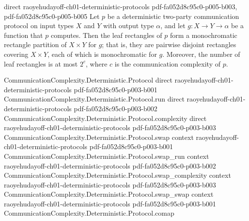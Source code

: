 \begin{theorem}
  {direct}
  {raoyehudayoff-ch01-deterministic-protocols}
  {pdf-fa052d8c95c0-p005-b003,
    pdf-fa052d8c95c0-p005-b005}
Let $p$ be a deterministic two-party communication protocol on input types $X$ and $Y$
with output type $\alpha$, and let $g : X \to Y \to \alpha$ be a function that $p$
computes. Then the leaf rectangles of $p$ form a monochromatic rectangle partition of $X
\times Y$ for $g$; that is, they are pairwise disjoint rectangles covering $X \times Y$,
each of which is monochromatic for $g$. Moreover, the number of leaf rectangles is at
most $2^{c}$, where $c$ is the communication complexity of $p$.
\end{theorem}

\begin{theorem}
\label{CommunicationComplexity.Deterministic.Protocol.reachesPath_isRectangle}
\leanok
{}
\proofstep
  {CommunicationComplexity.Deterministic.Protocol}
  {direct}
  {raoyehudayoff-ch01-deterministic-protocols}
  {pdf-fa052d8c95c0-p003-b001}
\proofstep
  {CommunicationComplexity.Deterministic.Protocol.run}
  {direct}
  {raoyehudayoff-ch01-deterministic-protocols}
  {pdf-fa052d8c95c0-p003-b002}
\proofstep
  {CommunicationComplexity.Deterministic.Protocol.complexity}
  {direct}
  {raoyehudayoff-ch01-deterministic-protocols}
  {pdf-fa052d8c95c0-p003-b003}
\proofstep
  {CommunicationComplexity.Deterministic.Protocol.swap}
  {context}
  {raoyehudayoff-ch01-deterministic-protocols}
  {pdf-fa052d8c95c0-p003-b001}
\proofstep
  {CommunicationComplexity.Deterministic.Protocol.swap_run}
  {context}
  {raoyehudayoff-ch01-deterministic-protocols}
  {pdf-fa052d8c95c0-p003-b002}
\proofstep
  {CommunicationComplexity.Deterministic.Protocol.swap_complexity}
  {context}
  {raoyehudayoff-ch01-deterministic-protocols}
  {pdf-fa052d8c95c0-p003-b003}
\proofstep
  {CommunicationComplexity.Deterministic.Protocol.swap_swap}
  {context}
  {raoyehudayoff-ch01-deterministic-protocols}
  {pdf-fa052d8c95c0-p003-b001}
\proofstep
  {CommunicationComplexity.Deterministic.Protocol.comap}

\end{theorem}
